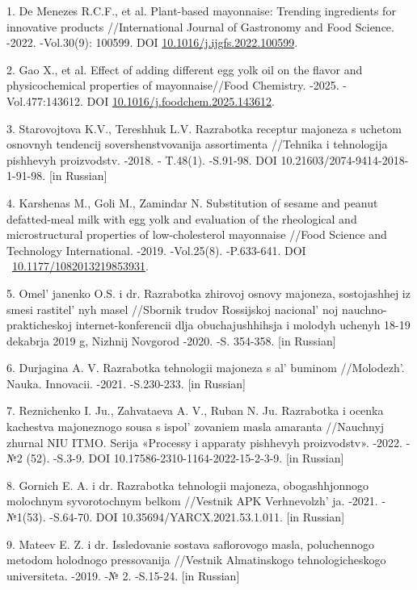 \begin{refs}
1. De Menezes R.C.F., et al. Plant-based mayonnaise: Trending
ingredients for innovative products //International Journal of
Gastronomy and Food Science. -2022. -Vol.30(9): 100599. DOI
\href{https://doi.org/10.1016/j.ijgfs.2022.100599}{10.1016/j.ijgfs.2022.100599}.

2. Gao X., et al. Effect of adding different egg yolk oil on the flavor
and physicochemical properties of mayonnaise//Food Chemistry. -2025.
-Vol.477:143612. DOI
\href{https://doi.org/10.1016/j.foodchem.2025.143612}{10.1016/j.foodchem.2025.143612}.

3. Starovojtova K.V., Tereshhuk L.V. Razrabotka receptur majoneza s
uchetom osnovnyh tendencij sovershenstvovanija assortimenta //Tehnika i
tehnologija pishhevyh proizvodstv. -2018. - T.48(1). -S.91-98. DOI
10.21603/2074-9414-2018-1-91-98. {[}in Russian{]}

4. Karshenas M., Goli M., Zamindar N. Substitution of sesame and peanut
defatted-meal milk with egg yolk and evaluation of the rheological and
microstructural properties of low-cholesterol mayonnaise //Food Science
and Technology International. -2019. -Vol.25(8). -P.633-641. DOI
~\href{https://doi.org/10.1177/1082013219853931}{10.1177/1082013219853931}.

5. Omel' janenko O.S. i dr. Razrabotka zhirovoj osnovy
majoneza, sostojashhej iz smesi rastitel' nyh masel
//Sbornik trudov Rossijskoj nacional' noj
nauchno-prakticheskoj internet-konferencii dlja obuchajushhihsja i
molodyh uchenyh 18-19 dekabrja 2019 g, Nizhnij Novgorod -2020. -S.
354-358. {[}in Russian{]}

6. Durjagina A. V. Razrabotka tehnologii majoneza s
al' buminom //Molodezh'. Nauka. Innovacii.
-2021. -S.230-233. {[}in Russian{]}

7. Reznichenko I. Ju., Zahvataeva A. V., Ruban N. Ju. Razrabotka i ocenka
kachestva majoneznogo sousa s ispol' zovaniem masla
amaranta //Nauchnyj zhurnal NIU ITMO. Serija «Processy i apparaty
pishhevyh proizvodstv». -2022. -№2 (52). -S.3-9. DOI
10.17586-2310-1164-2022-15-2-3-9. {[}in Russian{]}

8. Gornich E. A. i dr. Razrabotka tehnologii majoneza, obogashhjonnogo
molochnym syvorotochnym belkom //Vestnik APK
Verhnevolzh' ja. -2021. -№1(53). -S.64-70. DOI
10.35694/YARCX.2021.53.1.011. {[}in Russian{]}

9. Mateev E. Z. i dr. Issledovanie sostava saflorovogo masla,
poluchennogo metodom holodnogo pressovanija //Vestnik Almatinskogo
tehnologicheskogo universiteta. -2019. -№ 2. -S.15-24. {[}in Russian{]}


\end{refs}
